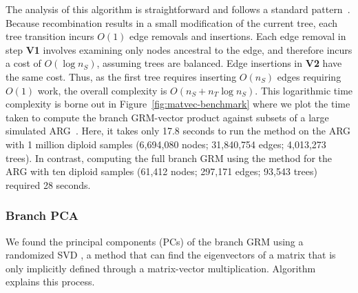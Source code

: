 The analysis of this algorithm is straightforward and follows a standard 
pattern~\citep{kelleher2016efficient,ralph2020efficiently}. Because
recombination results in a small modification of the current tree,
each tree transition
incurs $O(1)$ edge removals and insertions. Each edge removal in step \textbf{V1}
involves examining only nodes ancestral to the edge, and therefore incurs
a cost of $O(\log{n_S})$, assuming trees are balanced. Edge insertions
in \textbf{V2} have the same cost. Thus, 
as the first tree requires inserting $O(n_S)$ edges requiring $O(1)$
work, the overall complexity is $O(n_S + n_T \log{n_S})$.
This logarithmic time complexity is borne out in
Figure~\ref{fig:matvec-benchmark} where we plot the time taken to compute the 
branch GRM-vector product against subsets of a large simulated
ARG~\citep{andersontrocme2023genes}. Here, it takes only
17.8 seconds to run the \tsGRMv{} method 
on the ARG with 1 million diploid samples
(6,694,080 nodes; 31,840,754 edges; 4,013,273 trees).
In contrast, computing the full branch
GRM using the \tsGRM{} method 
for the ARG with ten diploid samples
(61,412 nodes;  297,171 edges; 93,543 trees) required 28 seconds.


\subsubsection{Branch PCA}

We found the principal components (PCs) of the branch GRM
using a randomized SVD \citep{halko2011findingstructure},
a method that can find the
eigenvectors of a matrix that is only implicitly defined through a matrix-vector multiplication.
Algorithm~ explains this process.

